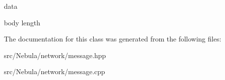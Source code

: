 data 

body length 

\-The documentation for this class was generated from the following files\-:\begin{DoxyCompactItemize}
\item 
src/\-Nebula/network/message.\-hpp\item 
src/\-Nebula/network/message.\-cpp\end{DoxyCompactItemize}
